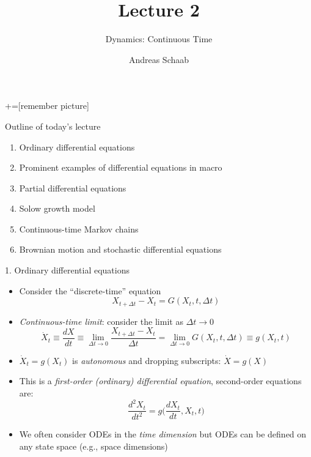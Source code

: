 \documentclass[10pt]{beamer}
\title{\large Lecture 2}
\subtitle{Dynamics: Continuous Time}
\author{Andreas Schaab}
\date{}
\begin{document}
+=[remember picture]
\thispagestyle{empty}
\maketitle 
\newpage

\addtocounter{framenumber}{-1}


\begin{frame}{Outline of today's lecture}
\addtocounter{framenumber}{-1}
\begin{enumerate}
\item Ordinary differential equations
\item Prominent examples of differential equations in macro
\item Partial differential equations
\item Solow growth model
\item Continuous-time Markov chains
\item Brownian motion and stochastic differential equations
\end{enumerate}
\end{frame}



\begin{frame}{1. Ordinary differential equations}
\begin{itemize}
\item Consider the ``discrete-time'' equation 
\begin{equation*}
	X_{t+\Delta t} - X_t = G(X_t, t, \Delta t)
\end{equation*}

\item \textit{Continuous-time limit}: consider the limit as $\Delta t \to 0$
\begin{equation*}
	\dot X_t \equiv \frac{dX}{dt} \equiv \lim_{\Delta t \to 0} \frac{X_{t+\Delta t} - X_t}{\Delta t} = \lim_{\Delta t \to 0} G(X_t, t, \Delta t) \equiv g(X_t, t)
\end{equation*}

\item $\dot X_t = g(X_t)$ is \textit{autonomous} and dropping subscripts: $\dot X = g(X)$

\item This is a \textit{first-order (ordinary) differential equation}, second-order equations are:
\begin{equation*}
	\frac{d^2 X_t}{dt^2} = g \bigg( \frac{dX_t}{dt} , X_t, t \bigg)
\end{equation*}

\item We often consider ODEs in the \textit{time dimension} but ODEs can be defined on any state space (e.g., space dimensions)

\end{itemize}
\end{frame}
\end{document}
